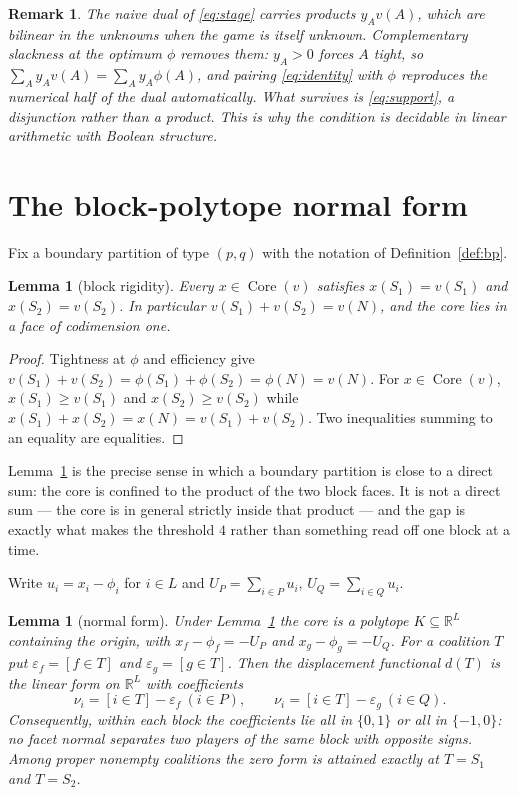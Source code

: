 \documentclass[11pt]{article}
\newtheorem{lemma}[theorem]{Lemma}
\newtheorem{remark}[theorem]{Remark}
\newcommand{\core}{\operatorname{Core}}
\begin{document}
\begin{remark}
The naive dual of \eqref{eq:stage} carries products $y_Av(A)$, which are
bilinear in the unknowns when the game is itself unknown.  Complementary
slackness at the optimum $\phi$ removes them: $y_A>0$ forces $A$ tight, so
$\sum_Ay_Av(A)=\sum_Ay_A\phi(A)$, and pairing \eqref{eq:identity} with $\phi$
reproduces the numerical half of the dual automatically.  What survives is
\eqref{eq:support}, a disjunction rather than a product.  This is why the
condition is decidable in linear arithmetic with Boolean structure.
\end{remark}

\section{The block-polytope normal form}\label{sec:frame}

Fix a boundary partition of type $(p,q)$ with the notation of
Definition~\ref{def:bp}.

\begin{lemma}[block rigidity]\label{lem:rigid}
Every $x\in\core(v)$ satisfies $x(S_1)=v(S_1)$ and $x(S_2)=v(S_2)$.  In
particular $v(S_1)+v(S_2)=v(N)$, and the core lies in a face of codimension
one.
\end{lemma}

\begin{proof}
Tightness at $\phi$ and efficiency give
$v(S_1)+v(S_2)=\phi(S_1)+\phi(S_2)=\phi(N)=v(N)$.  For $x\in\core(v)$,
$x(S_1)\ge v(S_1)$ and $x(S_2)\ge v(S_2)$ while
$x(S_1)+x(S_2)=x(N)=v(S_1)+v(S_2)$.  Two inequalities summing to an equality
are equalities.
\end{proof}

Lemma~\ref{lem:rigid} is the precise sense in which a boundary partition is
close to a direct sum: the core is confined to the product of the two block
faces.  It is not a direct sum --- the core is in general strictly inside that
product --- and the gap is exactly what makes the threshold $4$ rather than
something read off one block at a time.

Write $u_i=x_i-\phi_i$ for $i\in L$ and $U_P=\sum_{i\in P}u_i$,
$U_Q=\sum_{i\in Q}u_i$.

\begin{lemma}[normal form]\label{lem:normal}
Under Lemma~\ref{lem:rigid} the core is a polytope $K\subseteq\mathbb R^L$
containing the origin, with $x_f-\phi_f=-U_P$ and $x_g-\phi_g=-U_Q$.  For a
coalition $T$ put $\varepsilon_f=[f\in T]$ and $\varepsilon_g=[g\in T]$.  Then
the displacement functional $d(T)$ is the linear form on $\mathbb R^L$ with
coefficients
\[
 \nu_i=[i\in T]-\varepsilon_f\ (i\in P),\qquad
 \nu_i=[i\in T]-\varepsilon_g\ (i\in Q).
\]
Consequently, within each block the coefficients lie all in $\{0,1\}$ or all in
$\{-1,0\}$: \emph{no facet normal separates two players of the same block with
opposite signs}.  Among proper nonempty coalitions the zero form is attained
exactly at $T=S_1$ and $T=S_2$.
\end{lemma}
\end{document}
